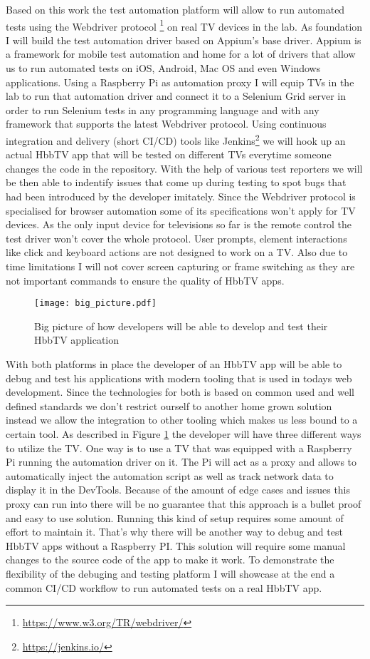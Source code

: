 Based on this work the test automation platform will allow to run automated tests using the Webdriver protocol
\footnote{\url{https://www.w3.org/TR/webdriver/}} on real TV devices in the lab. As foundation I will build the
test automation driver based on Appium's base driver. Appium is a framework for mobile test automation and home
for a lot of drivers that allow us to run automated tests on iOS, Android, Mac OS and even Windows applications.
Using a Raspberry Pi as automation proxy I will equip TVs in the lab to run that automation driver and connect
it to a Selenium Grid server in order to run Selenium tests in any programming language and with any framework
that supports the latest Webdriver protocol. Using continuous integration and delivery (short CI/CD) tools like
Jenkins\footnote{\url{https://jenkins.io/}} we will hook up an actual HbbTV app that will be tested on different
TVs everytime someone changes the code in the repository. With the help of various test reporters we will be then
able to indentify issues that come up during testing to spot bugs that had been introduced by the developer
imitately. Since the Webdriver protocol is specialised for browser automation some of its specifications won't
apply for TV devices. As the only input device for televisions so far is the remote control the test driver won't
cover the whole protocol. User prompts, element interactions like click and keyboard actions are not designed
to work on a TV. Also due to time limitations I will not cover screen capturing or frame switching as they are
not important commands to ensure the quality of HbbTV apps.

\begin{figure}[htb]
  \centering
  \texttt{[image: big\_picture.pdf]}
  \caption{Big picture of how developers will be able to develop and test their HbbTV application}\label{fig:bigpicture}
\end{figure}

With both platforms in place the developer of an HbbTV app will be able to debug and test his applications
with modern tooling that is used in todays web development. Since the technologies for both is based on
common used and well defined standards we don't restrict ourself to another home grown solution instead we
allow the integration to other tooling which makes us less bound to a certain tool. As described in Figure
\ref{fig:bigpicture} the developer will have three different ways to utilize the TV. One way is to use
a TV that was equipped with a Raspberry Pi running the automation driver on it. The Pi will act as a proxy
and allows to automatically inject the automation script as well as track network data to display it in the
DevTools. Because of the amount of edge cases and issues this proxy can run into there will be no guarantee
that this approach is a bullet proof and easy to use solution. Running this kind of setup requires some amount
of effort to maintain it. That's why there will be another way to debug and test HbbTV apps without a
Raspberry PI. This solution will require some manual changes to the source code of the app to make it work.
To demonstrate the flexibility of the debuging and testing platform I will showcase at the end a common
CI/CD workflow to run automated tests on a real HbbTV app.

